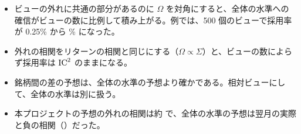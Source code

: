 \begin{keybox}[この章のまとめ]
\begin{itemize}
\item ビューの外れに共通の部分があるのに $\Omega$ を対角にすると、全体の水準への確信がビューの数に比例して積み上がる。例では、500 個のビューで採用率が 0.25\% から \% になった。
\item 外れの相関をリターンの相関と同じにする（$\Omega\propto\Sigma$）と、ビューの数によらず採用率は $\mathrm{IC}^2$ のままになる。
\item 銘柄間の差の予想は、全体の水準の予想より確かである。相対ビューにして、全体の水準は別に扱う。
\item 本プロジェクトの予想の外れの相関は約  で、全体の水準の予想は翌月の実際と負の相関（）だった。
\end{itemize}
\end{keybox}
